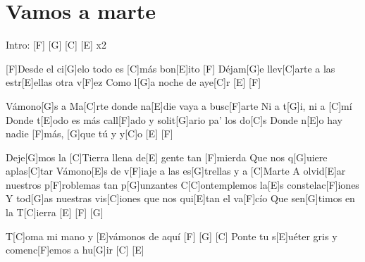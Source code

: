 \section{Vamos a marte}

\noindent
\chordF
\chordG
\chordC
\chordE
\chordAm 

\vspace{1cm}

\begin{guitar}
	\begin{multicols}{2}
	
		Intro: \hspace{0.5cm} [F] \hspace{0.5cm}[G] \hspace{0.5cm} [C] \hspace{0.5cm} [E] \hspace{0.3cm} x2
		
		\newline
	
		[F]Desde el ci[G]elo todo es [C]más bon[E]ito \hspace{0.2cm} [F] \vspace{0.1cm}
		Déjam[G]e llev[C]arte a las estr[E]ellas otra v[F]ez
		Como l[G]a noche de aye[C]r \hspace{0.5cm} [E] \hspace{0.5cm} [F]
		
		\newline
		Vámono[G]s a Ma[C]rte donde na[E]die vaya a busc[F]arte
		Ni a t[G]i, ni a [C]mí
		Donde t[E]odo es más call[F]ado y solit[G]ario pa' los do[C]s
		Donde n[E]o hay nadie [F]más, [G]que tú y y[C]o \hspace{0.5cm} [E] \hspace{0.5cm} [F] 
		
		\newline
		Deje[G]mos la [C]Tierra llena de[E] gente tan [F]mierda
		Que nos q[G]uiere aplas[C]tar
		Vámono[E]s de v[F]iaje a las es[G]trellas y a [C]Marte
		A olvid[E]ar nuestros p[F]roblemas tan p[G]unzantes
		C[C]ontemplemos la[E]s constelac[F]iones
		Y tod[G]as nuestras vis[C]iones que nos qui[E]tan el va[F]cío
		Que sen[G]timos en la T[C]ierra \hspace{0.5cm} [E] \hspace{0.5cm} [F] \hspace{0.5cm} [G]

		\newline		
		T[C]oma mi mano y [E]vámonos de aquí \hspace{0.1cm} [F] \hspace{0.5cm} [G] \hspace{0.5cm} [C] \vspace{0.1cm}
		Ponte tu s[E]uéter gris y comenc[F]emos a hu[G]ir \hspace{0.1cm} [C] \hspace{0.5cm} [E]
		

\end{multicols}
\end{guitar}

